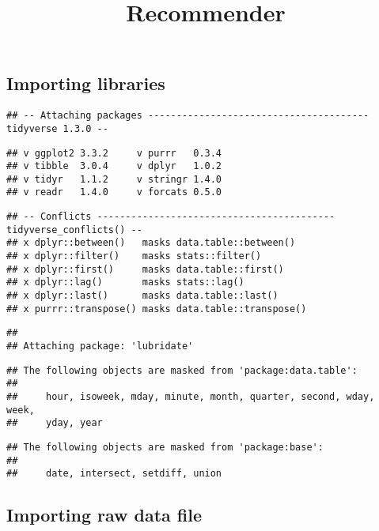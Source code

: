 \documentclass[
]{article}
\title{Recommender}
\author{}
\date{\vspace{-2.5em}}
\begin{document}
\maketitle

\hypertarget{importing-libraries}{%
\subsection{Importing libraries}\label{importing-libraries}}

\begin{verbatim}
## -- Attaching packages --------------------------------------- tidyverse 1.3.0 --
\end{verbatim}

\begin{verbatim}
## v ggplot2 3.3.2     v purrr   0.3.4
## v tibble  3.0.4     v dplyr   1.0.2
## v tidyr   1.1.2     v stringr 1.4.0
## v readr   1.4.0     v forcats 0.5.0
\end{verbatim}

\begin{verbatim}
## -- Conflicts ------------------------------------------ tidyverse_conflicts() --
## x dplyr::between()   masks data.table::between()
## x dplyr::filter()    masks stats::filter()
## x dplyr::first()     masks data.table::first()
## x dplyr::lag()       masks stats::lag()
## x dplyr::last()      masks data.table::last()
## x purrr::transpose() masks data.table::transpose()
\end{verbatim}

\begin{verbatim}
## 
## Attaching package: 'lubridate'
\end{verbatim}

\begin{verbatim}
## The following objects are masked from 'package:data.table':
## 
##     hour, isoweek, mday, minute, month, quarter, second, wday, week,
##     yday, year
\end{verbatim}

\begin{verbatim}
## The following objects are masked from 'package:base':
## 
##     date, intersect, setdiff, union
\end{verbatim}

\hypertarget{importing-raw-data-file}{%
\subsection{Importing raw data file}\label{importing-raw-data-file}}
\end{document}
